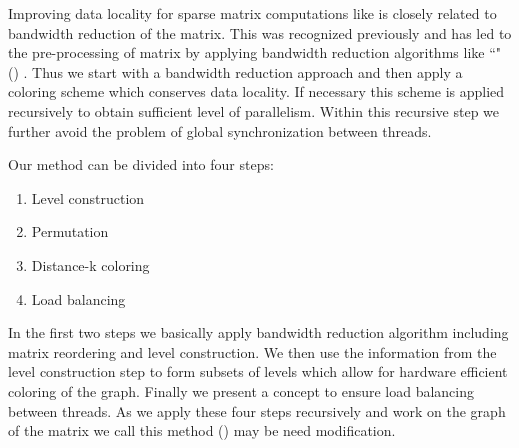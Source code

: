 Improving data locality for sparse matrix computations like \SpMV  is closely related to bandwidth reduction of the matrix. This was recognized previously and has led to the pre-processing of matrix by applying bandwidth reduction algorithms like ``\RCMfull" (\RCM) \cite{RCM,RCM_Sparse_computation}. Thus we start  with a bandwidth reduction approach and then apply a coloring scheme which conserves data locality. If necessary this scheme is applied recursively to obtain sufficient level of parallelism. Within this recursive step we further avoid the problem of global synchronization between threads.

 
Our method can be divided into four steps:
\begin{enumerate}
	\item Level construction
	\item Permutation
	\item Distance-k coloring
	\item Load balancing
\end{enumerate}

In the first two steps we basically apply bandwidth reduction algorithm including matrix reordering and level construction. We then use the information from the level construction step to form subsets of levels which allow for hardware efficient \DK coloring of the graph. Finally we present a concept to ensure load balancing between threads. As we apply these four steps recursively and work on the graph of the matrix we call this method  \RACE (\RACEfull) {\CA may be need modification}.



